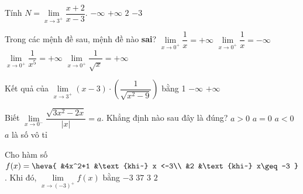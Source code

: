 \begin{ex}%
	Tính $N=\lim\limits_{x\to{3^{+}}}\dfrac{x+2}{x-3}$. 
	\choice 
		 {$-\infty$}
		{\True  $+\infty$}
		{$2$} 
		{$-3$} 
\end{ex}

\begin{ex}%
	Trong các mệnh đề sau, mệnh đề nào  \textbf{sai}?
	\choice 
		{$\lim\limits_{x\to  0^{+}}\dfrac{1}{x}=+\infty$}
		 {\True $\lim\limits_{x\to 0^{+}}\dfrac{1}{x}=-\infty$}
		{$\lim\limits_{x\to 0^{+}}\dfrac{1}{x^5}=+\infty$} 
		{$\lim\limits_{x\to 0^{+}}\dfrac{1}{\sqrt{{x}}}=+\infty$} 
\end{ex}

\begin{ex}%
	Kết quả của $\lim\limits_{x\to{3^{+}}}(x-3)\cdot  \left(\dfrac{1}{\sqrt{x^2-9}}\right)$ bằng
	 \choice
		{1} 
		{}
		{$-\infty$} 
		{$+\infty$} 
\end{ex}

\begin{ex}%
	Biết $\lim\limits_{x\to 0^-}\dfrac{\sqrt{3x^2-2x}}{\left|x\right|}=a$. Khẳng định nào sau đây là đúng? 
	\choice 
		{\True  $a > 0$}
		{$a=0$} 
		{$a < 0$} 
		{$a$ là  số vô tỉ}
\end{ex}

\begin{ex}%
	 Cho hàm số $f(x)=
	 \heva{
	 &4x^2+1 &\text{khi~} x <-3\\
	&2  &\text{khi~} x\geq-3
	}$. Khi đó, $\lim\limits_{x\to  (-3)^+} f(x)$ bằng
	\choice 
		 {$-3$}
		{$37$} 
		{$3$} 
		{\True $2$} 
\end{ex}

